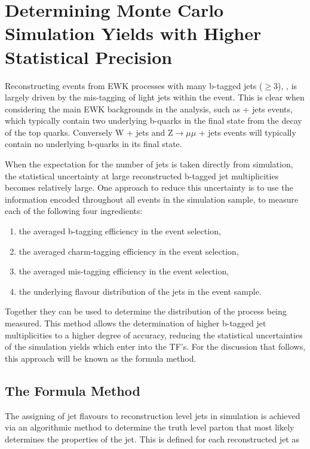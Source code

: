 \section{Determining Monte Carlo Simulation Yields with Higher Statistical Precision}
\label{subsec:backgroundestimation}

Reconstructing events from \ac{EWK} processes with many b-tagged jets ($\geq$3), \nbreco, is largely driven by the mis-tagging of light jets within the event. This is clear when considering the main \ac{EWK} backgrounds in the analysis, such as \ttbar + jets events, which typically contain two underlying b-quarks in the final state from the decay of the top quarks. Conversely W + jets and Z$\rightarrow \mu\mu$ + jets events will typically contain no underlying b-quarks in its final state.

When the expectation for the number of \nbreco jets is taken directly from simulation, the statistical uncertainty at large reconstructed b-tagged jet multiplicities becomes relatively large. One approach to reduce this uncertainty is to use the information encoded throughout all events in the simulation sample, to measure each of the following four ingredients:

\begin{enumerate}
\item the averaged b-tagging efficiency in the event selection,
\item the averaged charm-tagging efficiency in the event selection,
\item the averaged mis-tagging efficiency in the event selection,
\item the underlying flavour distribution of the jets in the event sample.
\end{enumerate}

Together they can be used to determine the \nbreco distribution of the process being measured. This method allows the determination of higher b-tagged jet multiplicities to a higher degree of accuracy, reducing the statistical uncertainties of the simulation yields which enter into the \ac{TF}'s. For the discussion that follows, this approach will be known as the formula method.

\subsection{The Formula Method}
\label{subsec:formulamethod}

The assigning of jet flavours to reconstruction level jets in simulation is achieved via an algorithmic method to determine the truth level parton that most likely determines the properties of the jet. This is defined for each reconstructed jet as

